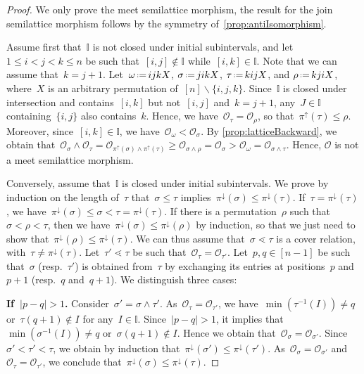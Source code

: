 \documentclass{amsart}
\theoremstyle{definition}
\newcommand{\ssm}{\smallsetminus} %
\newcommand{\eqdef}{\mbox{\,\raisebox{0.2ex}{\scriptsize\ensuremath{\mathrm:}}\ensuremath{=}\,}} %
\newcommand{\para}[1]{\medskip\noindent\textbf{#1}} %
\newcommand{\meet}{\wedge} %
\newcommand{\projDown}{\pi^\downarrow} %
\newcommand{\projUp}{\pi^\uparrow} %
\newcommand{\Or}{\mathcal O}  %
\newcommand{\II}{\mathbb I} %
\begin{document}
\begin{proof}
We only prove the meet semilattice morphism, the result for the join semilattice morphism follows by the symmetry of~\cref{prop:antiIsomorphism}.

Assume first that~$\II$ is not closed under initial subintervals, and let~$1 \le i < j < k \le n$ be such that~$[i,j] \notin \II$ while~$[i,k] \in \II$.
Note that we can assume that~$k = j+1$.
Let~$\omega \eqdef i j k X$, $\sigma \eqdef j i k X$, $\tau \eqdef k i j X$, and $\rho \eqdef k j i X$, where~$X$ is an arbitrary permutation of~$[n] \ssm \{i,j,k\}$.
Since~$\II$ is closed under intersection and contains~$[i,k]$ but not~$[i,j]$ and~$k = j+1$, any~$J \in \II$ containing~$\{i,j\}$ also contains~$k$.
Hence, we have~$\Or_\tau = \Or_\rho$, so that~$\projUp(\tau) \le \rho$.
Moreover, since~$[i,k] \in \II$, we have~${\Or_\omega < \Or_\sigma}$.
By \cref{prop:latticeBackward}, we obtain that~${\Or_\sigma \meet \Or_\tau = \Or_{\projUp(\sigma) \meet \projUp(\tau)} \ge \Or_{\sigma \meet \rho} = \Or_\sigma > \Or_\omega = \Or_{\sigma \meet \tau}}$.
Hence, $\Or$ is not a meet semilattice morphism.

Conversely, assume that~$\II$ is closed under initial subintervals.
We prove by induction on the length of~$\tau$ that~$\sigma \le \tau$ implies~$\projDown(\sigma) \le \projDown(\tau)$.
If~$\tau = \projDown(\tau)$, we have~$\projDown(\sigma) \le \sigma < \tau = \projDown(\tau)$.
If there is a permutation~$\rho$ such that~$\sigma < \rho < \tau$, then we have~$\projDown(\sigma) \le \projDown(\rho)$ by induction, so that we just need to show that~$\projDown(\rho) \le \projDown(\tau)$.
We can thus assume that~$\sigma \lessdot \tau$ is a cover relation, with~$\tau \ne \projDown(\tau)$.
Let~$\tau' \lessdot \tau$ be such that~$\Or_\tau = \Or_{\tau'}$.
Let~$p,q \in [n-1]$ be such that~$\sigma$ (resp.~$\tau'$) is obtained from~$\tau$ by exchanging its entries at positions~$p$ and~$p+1$ (resp.~$q$ and~$q+1$).
We distinguish three cases:

\para{If~$|p-q| > 1$.} Consider~$\sigma' = \sigma \meet \tau'$. As~$\Or_\tau = \Or_{\tau'}$, we have~$\min(\tau^{-1}(I)) \ne q$ or~$\tau(q+1) \notin I$ for any~$I \in \II$.
Since~$|p-q| > 1$, it implies that~$\min(\sigma^{-1}(I)) \ne q$ or~$\sigma(q+1) \notin I$.
Hence we obtain that~$\Or_\sigma = \Or_{\sigma'}$.
Since~$\sigma' < \tau' < \tau$, we obtain by induction that~$\projDown(\sigma') \le \projDown(\tau')$.
As~$\Or_\sigma = \Or_{\sigma'}$ and~$\Or_\tau = \Or_{\tau'}$, we conclude that~$\projDown(\sigma) \le \projDown(\tau)$.


\end{proof}
\end{document}
